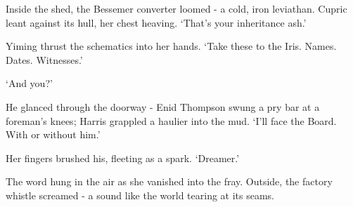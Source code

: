 Inside the shed, the Bessemer converter loomed - a cold, iron leviathan. Cupric leant against its hull, her chest heaving. `That's your inheritance ash.'

Yiming thrust the schematics into her hands. `Take these to the Iris. Names. Dates. Witnesses.'

`And you?'

He glanced through the doorway - Enid Thompson swung a pry bar at a foreman's knees; Harris grappled a haulier into the mud. `I'll face the Board. With or without him.'

Her fingers brushed his, fleeting as a spark. `Dreamer.'

The word hung in the air as she vanished into the fray. Outside, the factory whistle screamed - a sound like the world tearing at its seams.